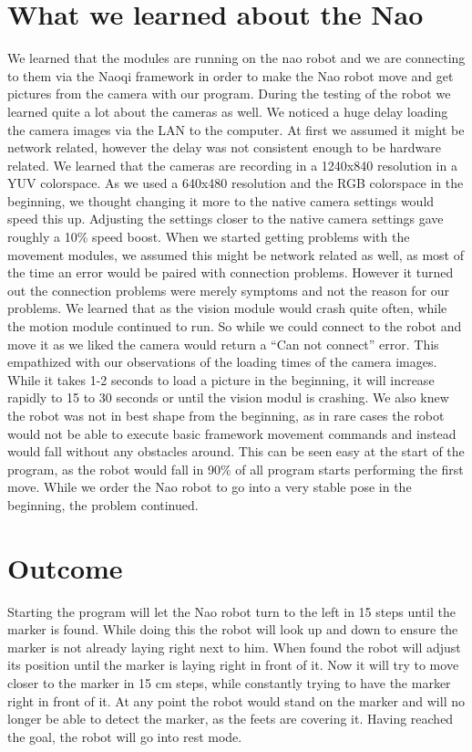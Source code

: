 \documentclass{article}
\begin{document}
\section{What we learned about the Nao}
We learned that the modules are running on the nao robot and we are connecting to them via the Naoqi framework in order to make the Nao robot move and get pictures from the camera with our program. During the testing of the robot we learned quite a lot about the cameras as well. We noticed a huge delay loading the camera images via the LAN to the computer. At first we assumed it might be network related, however the delay was not consistent enough to be hardware related. We learned that the cameras are recording in a 1240x840 resolution in a YUV colorspace. As we used a 640x480 resolution and the RGB colorspace in the beginning, we thought changing it more to the native camera settings would speed this up. Adjusting the settings closer to the native camera settings gave roughly a 10\% speed boost. When we started getting problems with the movement modules, we assumed this might be network related as well, as most of the time an error would be paired with connection problems. However it turned out the connection problems were merely symptoms and not the reason for our problems. We learned that as the vision module would crash quite often, while the motion module continued to run. So while we could connect to the robot and move it as we liked the camera would return a “Can not connect” error. This empathized with our observations of the loading times of the camera images. While it takes 1-2 seconds to load a picture in the beginning, it will increase rapidly to 15 to 30 seconds or until the vision modul is crashing. We also knew the robot was not in best shape from the beginning, as in rare cases the robot would not be able to execute basic framework movement commands and instead would fall without any obstacles around. This can be seen easy at the start of the program, as the robot would fall in 90\% of all program starts performing the first move. While we order the Nao robot to go into a very stable pose in the beginning, the problem continued.

\section{Outcome}
Starting the program will let the Nao robot turn to the left in 15\degree{} steps until the marker is found. While doing this the robot will look up and down to ensure the marker is not already laying right next to him. When found the robot will adjust its position until the marker is laying right in front of it. Now it will try to move closer to the marker in 15 cm steps, while constantly trying to have the marker right in front of it. At any point the robot would stand on the marker and will no longer be able to detect the marker, as the feets are covering it. Having reached the goal, the robot will go into rest mode.
\end{document}
